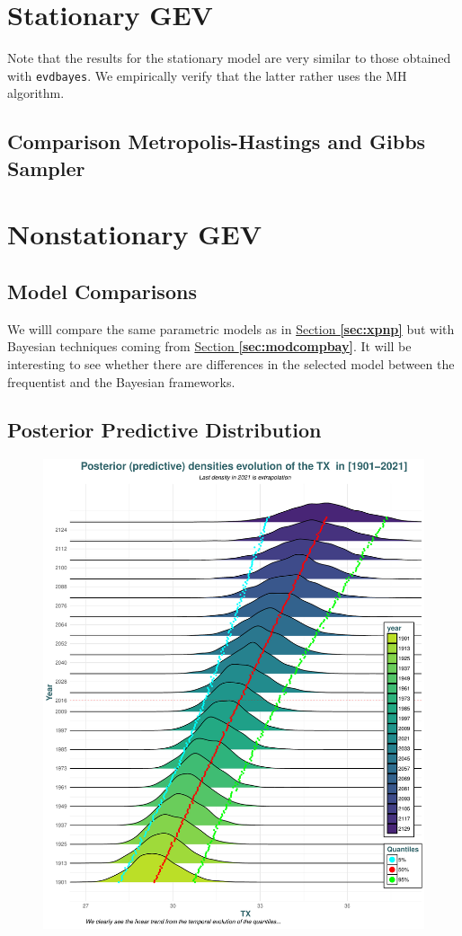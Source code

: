 \section{Stationary GEV}

Note that the results for the stationary model are very similar to those obtained with \texttt{evdbayes}. We empirically verify that the latter rather uses the MH algorithm.

\subsection*{Comparison Metropolis-Hastings and Gibbs Sampler}


\section{Nonstationary GEV}




\subsection{Model Comparisons}

We willl compare the same parametric models as in \hyperref[sec:xpnp]{Section \textbf{\ref{sec:xpnp}}} but with Bayesian techniques coming from \hyperref[sec:modcompbay]{Section \textbf{\ref{sec:modcompbay}}}. It will be interesting to see whether there are differences in the selected model between the frequentist and the Bayesian frameworks.

 



\subsection{Posterior Predictive Distribution} 

 \begin{figure}[!htb]
  	\centering	\includegraphics[width=0.8\linewidth]{predpred.pdf}\caption{ }\label{fig:post_pred}
 \end{figure}
  
